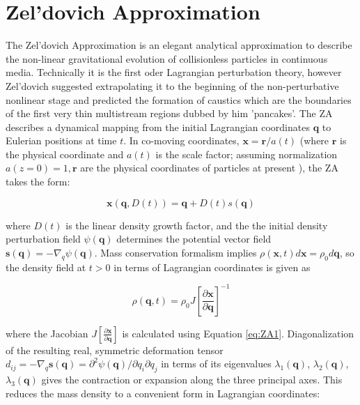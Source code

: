 \section{Zel'dovich Approximation}

\label{sec:ZA}

The Zel'dovich Approximation is an elegant analytical approximation to describe the non-linear gravitational evolution of collisionless particles in continuous media. Technically it is the first oder Lagrangian perturbation theory, however Zel'dovich suggested extrapolating it to the beginning of the non-perturbative nonlinear stage and predicted the formation of caustics which are the boundaries of
the first very thin multistream regions dubbed by him  'pancakes'. The
ZA describes a dynamical mapping from the initial Lagrangian coordinates $\mathbf{q}$ to Eulerian positions at time $t$. In co-moving coordinates, $\mathbf{x} = \mathbf{r}/a(t)$ (where $\mathbf{r}$ is the physical coordinate  and $a(t)$ is the scale factor; assuming normalization $a(z=0)=1, \mathbf{r}$ are 
the physical coordinates of particles at present ), the ZA takes the form:

\begin{equation} \label{eq:ZA1}
 \mathbf{x}(\mathbf{q}, D(t) ) = \mathbf{q} + D(t) s(\mathbf{q}) 
\end{equation}

where $D(t)$ is the linear density growth factor, and the the initial density perturbation field $\psi(\mathbf{q})$ determines the potential vector field $\mathbf{s(q)} = - \nabla_q \psi(\mathbf{q})$. 
Mass conservation formalism implies $\rho(\mathbf{x}, t) d\mathbf{x} = \rho_0 d\mathbf{q} $, so the density field at $t>0$ in terms of Lagrangian coordinates is given as 

\begin{equation}
 \rho(\mathbf{q}, t) = \rho_0 J \left[ \frac{\partial\mathbf{x}}{\partial\mathbf{q}} \right]^{-1}
\end{equation}

where the Jacobian $J \left[ \frac{\partial\mathbf{x}}{\partial\mathbf{q}} \right]$ is calculated using Equation \ref{eq:ZA1}. Diagonalization of the resulting real, symmetric deformation tensor $d_{ij} = - \nabla_q \mathbf{s(q)} =  \partial^2 \psi(\mathbf{q})/ \partial q_i \partial q_j$ in terms of its eigenvalues $\lambda_1(\mathbf{q})$, $\lambda_2(\mathbf{q})$, $\lambda_3(\mathbf{q})$ gives the contraction or expansion along the three principal axes. This reduces the mass density to a convenient form in Lagrangian coordinates:

